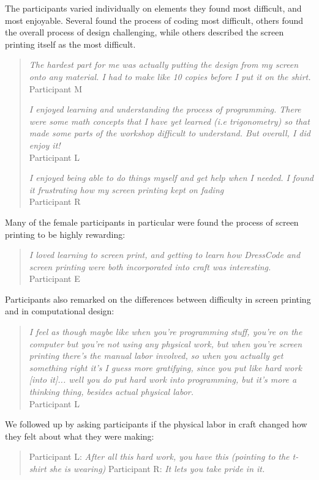 \documentclass{sigchi}
\begin{document}
The participants varied individually on elements they found most difficult, and most enjoyable. Several found the process of coding most difficult, others found the overall process of design challenging, while others described the screen printing itself as the most difficult.
\begin{quotation}

\textit{The hardest part for me was actually putting the design from my screen onto any material. I had to make like 10 copies before I put it on the shirt.}
\\Participant M

\textit{I enjoyed learning and understanding the process of programming. There were some math concepts that I have yet learned (i.e trigonometry) so that made some parts of the workshop difficult to understand. But overall, I did enjoy it!}
\\Participant L

\textit{I enjoyed being able to do things myself and get help when I needed. I found it frustrating how my screen printing kept on fading}
\\Participant R

\end{quotation}

Many of the female participants in particular were found the process of screen printing to be highly rewarding:
\begin{quotation}
\textit{I loved learning to screen print, and getting to learn how DressCode and screen printing were both incorporated into craft was interesting.}
\\Participant E
\end{quotation}

Participants  also remarked on the differences between difficulty in screen printing and in computational design:
\begin{quotation}
\textit{I feel as though maybe like when you're programming stuff, you're on the computer but you're not using any physical work, but when you're screen printing there's the manual labor involved, so when you actually get something right it's I guess more gratifying, since you put like hard work [into it]... well you do put hard work into programming, but it's more a thinking thing, besides actual physical labor.}
\\Participant L
\end{quotation}

We followed up by asking participants if the physical labor in craft changed how they felt about what they were making:
\begin{quotation}
Participant L: \textit{After all this hard work, you have this (pointing to the t-shirt she is wearing)}
Participant R: \textit{It lets you take pride in it.}
\end{quotation}
\end{document}
